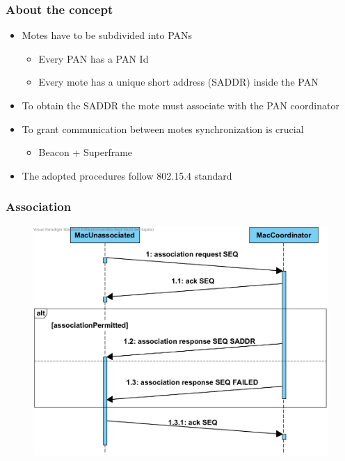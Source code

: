 \begin{frame}[fragile]
  \frametitle{About the concept}
  \begin{itemize}
    \item Motes have to be subdivided into PANs
    \begin{itemize}
    	\item Every PAN has a PAN Id
    	\item Every mote has a unique short address (SADDR) inside the PAN
    \end{itemize}
    \item To obtain the SADDR the mote must associate with the PAN coordinator
    \item To grant communication between motes synchronization is crucial
    \begin{itemize}
      \item Beacon + Superframe
    \end{itemize}
    \item The adopted procedures follow 802.15.4 standard
  \end{itemize}

\end{frame}

\begin{frame}[fragile]
  \frametitle{Association}
  \begin{figure}
    \centering
    \includegraphics[width=.8\textwidth]{img/Association.png}
  \end{figure}
\end{frame}

